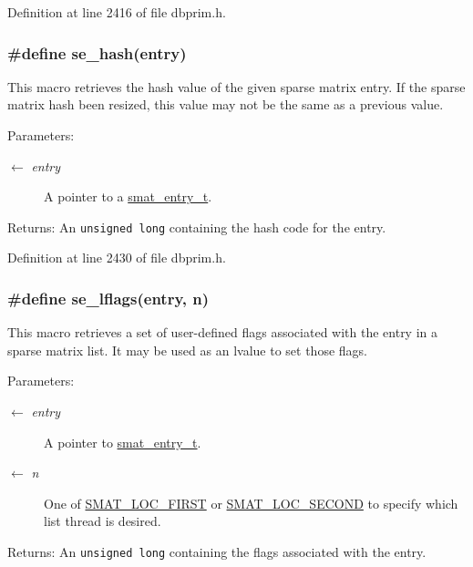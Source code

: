 Definition at line 2416 of file dbprim.h.\hypertarget{group__dbprim__smat_ga59}{
\subsubsection[se\_\-hash]{\setlength{\rightskip}{0pt plus 5cm}\#define se\_\-hash(entry)}}
\label{group__dbprim__smat_ga59}


This macro retrieves the hash value of the given sparse matrix entry. If the sparse matrix hash been resized, this value may not be the same as a previous value.

\begin{Desc}
\item[Parameters:]
\begin{description}
\item[\mbox{$\leftarrow$} {\em entry}]A pointer to a \hyperlink{group__dbprim__smat_ga2}{smat\_\-entry\_\-t}.\end{description}
\end{Desc}
\begin{Desc}
\item[Returns:]An {\tt unsigned long} containing the hash code for the entry.\end{Desc}


Definition at line 2430 of file dbprim.h.\hypertarget{group__dbprim__smat_ga64}{
\subsubsection[se\_\-lflags]{\setlength{\rightskip}{0pt plus 5cm}\#define se\_\-lflags(entry, n)}}
\label{group__dbprim__smat_ga64}


This macro retrieves a set of user-defined flags associated with the entry in a sparse matrix list. It may be used as an lvalue to set those flags.

\begin{Desc}
\item[Parameters:]
\begin{description}
\item[\mbox{$\leftarrow$} {\em entry}]A pointer to \hyperlink{group__dbprim__smat_ga2}{smat\_\-entry\_\-t}. \item[\mbox{$\leftarrow$} {\em n}]One of \hyperlink{group__dbprim__smat_gga70a137}{SMAT\_\-LOC\_\-FIRST} or \hyperlink{group__dbprim__smat_gga70a138}{SMAT\_\-LOC\_\-SECOND} to specify which list thread is desired.\end{description}
\end{Desc}
\begin{Desc}
\item[Returns:]An {\tt unsigned long} containing the flags associated with the entry.\end{Desc}


